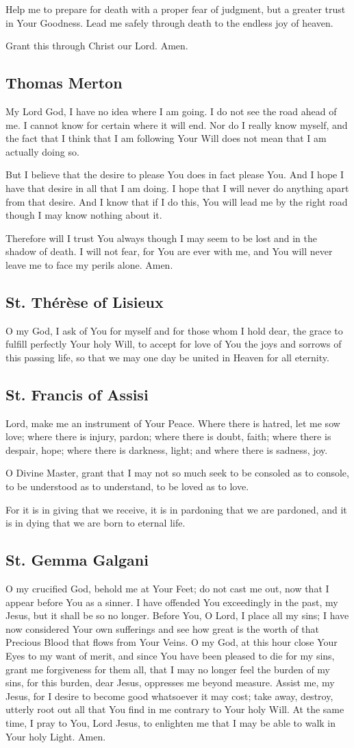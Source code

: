 \documentclass[12pt]{article}
\newcommand{\prayertitle}[1]{\subsection{#1}}
\begin{document}
Help me to prepare for death with a proper fear of judgment, but a greater trust in Your Goodness.
Lead me safely through death to the endless joy of heaven.

Grant this through Christ our Lord. Amen.

\prayertitle{Thomas Merton}
My Lord God, I have no idea where I am going. 
I do not see the road ahead of me.
I cannot know for certain where it will end.
Nor do I really know myself,  and the fact that I think that I am following Your Will does not mean that I am actually doing so.

But I believe that the desire to please You does in fact please You. 
And I hope I have that desire in all that I am doing. 
I hope that I will never do anything apart from that desire. 
And I know that if I do this, You will lead me by the right road though I may know nothing about it.

Therefore will I trust You always though I may seem to be lost and in the shadow of death.
I will not fear, for You are ever with me, and You will never leave me to face my perils alone. 
Amen.  

\prayertitle{St. Th\'{e}r\`{e}se of Lisieux}
O my God, I ask of You for myself and for those whom I hold dear, the grace to fulfill perfectly Your holy Will, to accept for love of You the joys and sorrows of this passing life, so that we may one day be united in Heaven for all eternity.

\prayertitle{St. Francis of Assisi}
Lord, make me an instrument of Your Peace.
Where there is hatred, let me sow love;
where there is injury, pardon;
where there is doubt, faith;
where there is despair, hope;
where there is darkness, light;
and where there is sadness, joy.

O Divine Master, grant that I may not so much seek to be consoled as to console, to be understood as to understand, to be loved as to love.

For it is in giving that we receive, it is in pardoning that we are pardoned, and it is in dying that we are born to eternal life.

\prayertitle{St. Gemma Galgani}
O my crucified God, behold me at Your Feet;
do not cast me out, now that I appear before You as a sinner.
I have offended You exceedingly in the past, my Jesus, but it shall be so no longer.
Before You, O Lord, I place all my sins;
I have now considered Your own sufferings and see how great is the worth of that Precious Blood that flows from Your Veins.
O my God, at this hour close Your Eyes to my want of merit, and since You have been pleased to die for my sins, grant me forgiveness for them all, that I may no longer feel the burden of my sins, for this burden, dear Jesus, oppresses me beyond measure.
Assist me, my Jesus, for I desire to become good whatsoever it may cost;
take away, destroy, utterly root out all that You find in me contrary to Your holy Will.
At the same time, I pray to You, Lord Jesus, to enlighten me that I may be able to walk in Your holy Light.
Amen.
\end{document}

